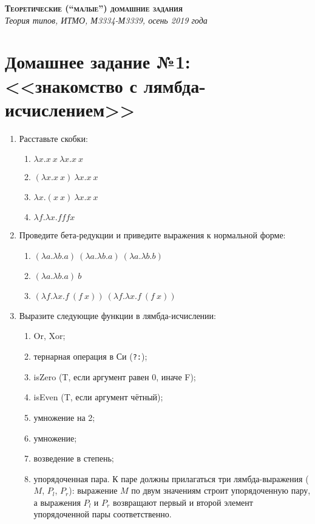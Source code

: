 \documentclass[10pt,a4paper,oneside]{article}
\begin{document}
\begin{center}{\Large\textsc{\textbf{Теоретические (``малые'') домашние задания}}}\\
             \it Теория типов, ИТМО, М3334-М3339, осень 2019 года\end{center}

\section*{Домашнее задание №1: <<знакомство с лямбда-исчислением>>}

\begin{enumerate}
\item Расставьте скобки:

\begin{enumerate}
\item $\lambda x.x\ x\ \lambda x.x\ x$
\item $(\lambda x.x\ x)\ \lambda x.x\ x$
\item $\lambda x.(x\ x)\ \lambda x.x\ x$
\item $\lambda f.\lambda x.f f f x$
\end{enumerate}

\item Проведите бета-редукции и приведите выражения к нормальной форме:

\begin{enumerate}
\item $(\lambda a.\lambda b.a)\ (\lambda a.\lambda b.a)\ (\lambda a.\lambda b.b)$
\item $(\lambda a.\lambda b.a)\ b$
\item $(\lambda f.\lambda x.f\ (f\ x))\ (\lambda f.\lambda x.f\ (f\ x))$
\end{enumerate}

\item Выразите следующие функции в лямбда-исчислении:

\begin{enumerate}
\item Or, Xor;
\item тернарная операция в Си (\verb!?:!);
\item isZero (T, если аргумент равен 0, иначе F);
\item isEven (T, если аргумент чётный);
\item умножение на 2;
\item умножение;
\item возведение в степень;
\item упорядоченная пара. К паре должны прилагаться три лямбда-выражения ($M$, $P_l$, $P_r$):
выражение $M$ по двум значениям строит упорядоченную пару, а выражения $P_l$ и $P_r$ возвращают
первый и второй элемент упорядоченной пары соответственно.


\end{enumerate}
\end{enumerate}
\end{document}
